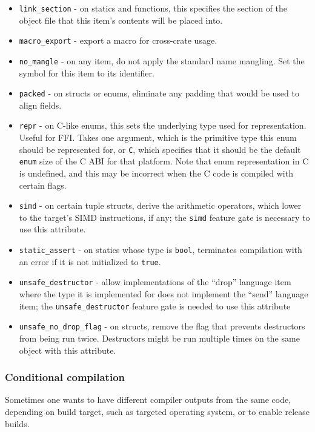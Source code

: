 \documentclass[]{article}
\begin{document}
\begin{itemize}
\itemsep1pt\parskip0pt
\item
  \texttt{link\_section} - on statics and functions, this specifies the
  section of the object file that this item's contents will be placed
  into.
\item
  \texttt{macro\_export} - export a macro for cross-crate usage.
\item
  \texttt{no\_mangle} - on any item, do not apply the standard name
  mangling. Set the symbol for this item to its identifier.
\item
  \texttt{packed} - on structs or enums, eliminate any padding that
  would be used to align fields.
\item
  \texttt{repr} - on C-like enums, this sets the underlying type used
  for representation. Useful for FFI. Takes one argument, which is the
  primitive type this enum should be represented for, or \texttt{C},
  which specifies that it should be the default \texttt{enum} size of
  the C ABI for that platform. Note that enum representation in C is
  undefined, and this may be incorrect when the C code is compiled with
  certain flags.
\item
  \texttt{simd} - on certain tuple structs, derive the arithmetic
  operators, which lower to the target's SIMD instructions, if any; the
  \texttt{simd} feature gate is necessary to use this attribute.
\item
  \texttt{static\_assert} - on statics whose type is \texttt{bool},
  terminates compilation with an error if it is not initialized to
  \texttt{true}.
\item
  \texttt{unsafe\_destructor} - allow implementations of the ``drop''
  language item where the type it is implemented for does not implement
  the ``send'' language item; the \texttt{unsafe\_destructor} feature
  gate is needed to use this attribute
\item
  \texttt{unsafe\_no\_drop\_flag} - on structs, remove the flag that
  prevents destructors from being run twice. Destructors might be run
  multiple times on the same object with this attribute.
\end{itemize}

\subsubsection{Conditional compilation}\label{conditional-compilation}

Sometimes one wants to have different compiler outputs from the same
code, depending on build target, such as targeted operating system, or
to enable release builds.
\end{document}
